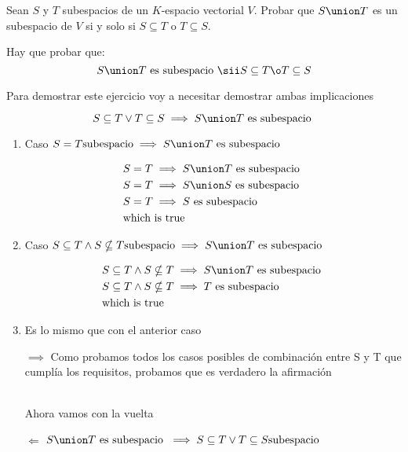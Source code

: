 \begin{enunciado}{\ejercicio}
  Sean $S$ y $T$ subespacios de un $K$-espacio vectorial $V$. Probar que $S\union T$ es un subespacio
  de $V$ si y solo si $S \subseteq T$ o $T \subseteq S$.
\end{enunciado}

Hay que probar que:
$$
  S \union T \text{ es subespacio }
  \sii
  S \subseteq T \o T \subseteq S
$$

Para demostrar este ejercicio voy a necesitar demostrar ambas implicaciones

$$ S \subseteq T \lor T \subseteq S \implies S \union T \text{ es subespacio } $$
\begin{enumerate}
  \item Caso $S = T \text{subespacio}\implies S \union T \text{ es subespacio }$ 
    
        \begin{align}
          & S = T \implies S \union T \text{ es subespacio }    \\
          & S = T \implies S \union S \text{ es subespacio }    \\
          & S = T \implies S \text{ es subespacio }             \\
          & \text{which is true}
        \end{align}

    \item Caso $S \subseteq T \land S \nsubseteq T \text{subespacio}\implies S \union T \text{ es subespacio }$ 

    \begin{align}
      & S \subseteq T \land S \nsubseteq T \implies S \union T \text{ es subespacio }    \\
      & S \subseteq T \land S \nsubseteq T \implies T \text{ es subespacio }             \\
      & \text{which is true}
    \end{align}

    \item Es lo mismo que con el anterior caso

    $ \implies $ Como probamos todos los casos posibles de combinación entre S y T que cumplía los requisitos,
    probamos que es verdadero la afirmación
    
    \\

    Ahora vamos con la vuelta

    $\Longleftarrow $ $S \union T \text{ es subespacio } \implies S \subseteq T \lor T \subseteq S \text{subespacio} $ 


\end{enumerate}

